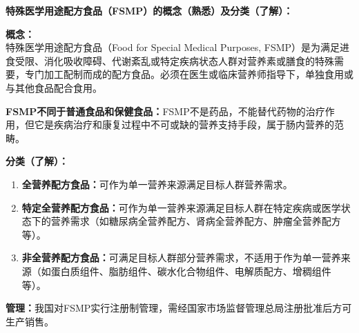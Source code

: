\begin{tipbox}
\textbf{特殊医学用途配方食品（FSMP）的概念（熟悉）及分类（了解）：}

\textbf{概念：}\\
特殊医学用途配方食品（Food for Special Medical Purposes, FSMP）是为满足进食受限、消化吸收障碍、代谢紊乱或特定疾病状态人群对营养素或膳食的特殊需要，专门加工配制而成的配方食品。必须在医生或临床营养师指导下，单独食用或与其他食品配合食用。

\textbf{FSMP不同于普通食品和保健食品：}FSMP不是药品，不能替代药物的治疗作用，但它是疾病治疗和康复过程中不可或缺的营养支持手段，属于肠内营养的范畴。

\textbf{分类（了解）：}
\begin{enumerate}[leftmargin=*]
    \item \textbf{全营养配方食品：}可作为单一营养来源满足目标人群营养需求。
    \item \textbf{特定全营养配方食品：}可作为单一营养来源满足目标人群在特定疾病或医学状态下的营养需求（如糖尿病全营养配方、肾病全营养配方、肿瘤全营养配方等）。
    \item \textbf{非全营养配方食品：}可满足目标人群部分营养需求，不适用于作为单一营养来源（如蛋白质组件、脂肪组件、碳水化合物组件、电解质配方、增稠组件等）。
\end{enumerate}

\textbf{管理：}我国对FSMP实行注册制管理，需经国家市场监督管理总局注册批准后方可生产销售。
\end{tipbox}


